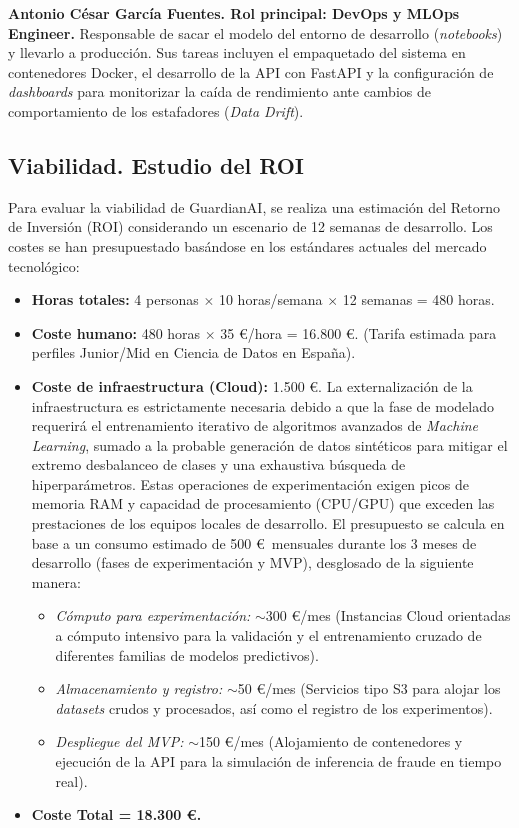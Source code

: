 \documentclass[12pt,a4paper]{report}
\begin{document}
\textbf{Antonio César García Fuentes. Rol principal: DevOps y MLOps Engineer.}
Responsable de sacar el modelo del entorno de desarrollo (\textit{notebooks}) y llevarlo a producción. Sus tareas incluyen el empaquetado del sistema en contenedores Docker, el desarrollo de la API con FastAPI y la configuración de \textit{dashboards} para monitorizar la caída de rendimiento ante cambios de comportamiento de los estafadores (\textit{Data Drift}).

\subsection{Viabilidad. Estudio del ROI}
Para evaluar la viabilidad de GuardianAI, se realiza una estimación del Retorno de Inversión (ROI) considerando un escenario de 12 semanas de desarrollo. Los costes se han presupuestado basándose en los estándares actuales del mercado tecnológico:
\begin{itemize}
    \item \textbf{Horas totales:} 4 personas $\times$ 10 horas/semana $\times$ 12 semanas = 480 horas.
    \item \textbf{Coste humano:} 480 horas $\times$ 35 \euro/hora = 16.800 \euro. (Tarifa estimada para perfiles Junior/Mid en Ciencia de Datos en España).
    \item \textbf{Coste de infraestructura (Cloud):} 1.500 \euro. La externalización de la infraestructura es estrictamente necesaria debido a que la fase de modelado requerirá el entrenamiento iterativo de algoritmos avanzados de \textit{Machine Learning}, sumado a la probable generación de datos sintéticos para mitigar el extremo desbalanceo de clases y una exhaustiva búsqueda de hiperparámetros. Estas operaciones de experimentación exigen picos de memoria RAM y capacidad de procesamiento (CPU/GPU) que exceden las prestaciones de los equipos locales de desarrollo. El presupuesto se calcula en base a un consumo estimado de 500 \euro\ mensuales durante los 3 meses de desarrollo (fases de experimentación y MVP), desglosado de la siguiente manera:
    \begin{itemize}
        \item \textit{Cómputo para experimentación:} $\sim$300 \euro/mes (Instancias Cloud orientadas a cómputo intensivo para la validación y el entrenamiento cruzado de diferentes familias de modelos predictivos).
        \item \textit{Almacenamiento y registro:} $\sim$50 \euro/mes (Servicios tipo S3 para alojar los \textit{datasets} crudos y procesados, así como el registro de los experimentos).
        \item \textit{Despliegue del MVP:} $\sim$150 \euro/mes (Alojamiento de contenedores y ejecución de la API para la simulación de inferencia de fraude en tiempo real).
    \end{itemize}
    \item \textbf{Coste Total = 18.300 \euro.}
\end{itemize}
\end{document}
